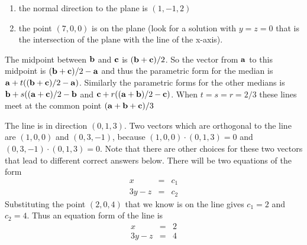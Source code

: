 \vspace{2mm}
{\begin{enumerate}
\renewcommand{\labelenumi}{(\alph{enumi})}
\item the normal direction to the plane is $(1,-1,2)$
\item the point $(7,0,0)$ is on the plane (look for a solution with $y=z=0$ that is the intersection of the plane with the line of the x-axis).
\end{enumerate}}

\vspace{2mm}
The midpoint between $\bb$ and $\cc$ is $(\bb+\cc)/2$. So the vector from
$\aa$ to this midpoint is $(\bb+\cc)/2-\aa$ and thus the parametric form for
the median is $\aa + t((\bb+\cc)/2-\aa)$. Similarly the parametric forms for the
other medians is $\bb + s((\aa+\cc)/2-\bb$ and $\cc + r((\aa+\bb)/2-\cc)$. When
$t=s=r=2/3$ these lines meet at the common point $(\aa+\bb+\cc)/3$

\vspace{2mm}
The line is in direction $(0,1,3)$. Two vectors which are orthogonal 
to the line are $(1,0,0)$ and $(0,3,-1)$, because $(1,0,0) \cdot (0,1,3) = 0$ 
and $(0,3,-1) \cdot (0,1,3) = 0$. Note that there are other choices for these 
two vectors that lead to different correct answers below. There will 
be two equations of the form 
\begin{eqnarray*}
x & = & c_1 \\
3y - z & = & c_2 
\end{eqnarray*}
Substituting the point $(2,0,4)$ that we know is on the line gives 
$c_1 = 2$ and $c_2 = 4$. Thus an equation form of the line is 
\begin{eqnarray*}
x & = & 2 \\
3y - z & = & 4 
\end{eqnarray*}

